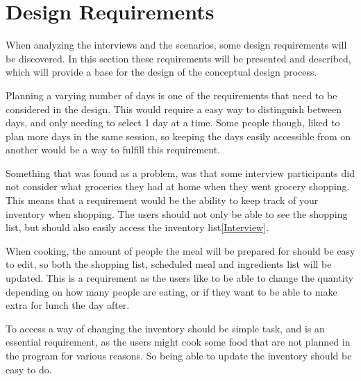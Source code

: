 \section{Design Requirements}

When analyzing the interviews and the scenarios, some design requirements will be discovered. In this section these requirements will be presented and described, which will provide a base for the design of the conceptual design process.

Planning a varying number of days is one of the requirements that need to be considered in the design. This would require a easy way to distinguish between days, and only needing to select 1 day at a time.
Some people though, liked to plan more days in the same session, so keeping the days easily accessible from on another would be a way to fulfill this requirement.

Something that was found as a problem, was that some interview participants did not consider what groceries they had at home when they went grocery shopping. This means that a requirement would be the ability to keep track of your inventory when shopping. The users should not only be able to see the shopping list, but should also easily access the inventory list\ref{Interview}.

When cooking, the amount of people the meal will be prepared for should be easy to edit, so both the shopping list, scheduled meal and ingredients list will be updated. This is a requirement as the users like to be able to change the quantity depending on how many people are eating, or if they want to be able to make extra for lunch the day after. %

To access a way of changing the inventory should be simple task, and is an essential requirement, as the users might cook some food that are not planned in the program for various reasons. So being able to update the inventory should be easy to do.